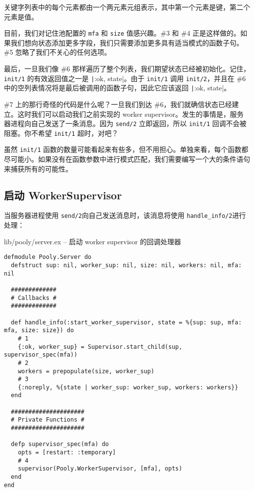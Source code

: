 关键字列表中的每个元素都由一个两元素元组表示，其中第一个元素是键，第二个元素是值。

目前，我们对记住池配置的 \texttt{mfa} 和
\texttt{size} 值感兴趣。\#3 和 \#4
正是这样做的。如果我们想向状态添加更多字段，我们只需要添加更多具有适当模式的函数子句。\#5
忽略了我们不关心的任何选项。

最后，一旦我们像 \#6
那样遍历了整个列表，我们期望状态已经被初始化。记住，\texttt{init/1}
的有效返回值之一是 \texttt|{:ok, state}|。由于
\texttt{init/1} 调用
\texttt{init/2}，并且在 \#6
中的空列表情况将是最后被调用的函数子句，因此它应该返回
\texttt|{:ok, state}|。

\#7 上的那行奇怪的代码是什么呢？一旦我们到达
\#6，我们就确信状态已经建立。这时我们可以启动我们之前实现的 worker
supervisor。发生的事情是，服务器进程向自己发送了一条消息。因为
\texttt{send/2} 立即返回，所以
\texttt{init/1} 回调不会被阻塞。你不希望
\texttt{init/1} 超时，对吧？

虽然 \texttt{init/1}
函数的数量可能看起来有些多，但不用担心。单独来看，每个函数都尽可能小。如果没有在函数参数中进行模式匹配，我们需要编写一个大的条件语句来捕获所有的可能性。


\subsection{启动 WorkerSupervisor}

当服务器进程使用 \texttt{send/2}向自己发送消息时，该消息将使用 \texttt{handle\_info/2}进行处理：

\begin{code}{lib/pooly/server.ex -- 启动 worker supervisor 的回调处理器}

\begin{verbatim}
defmodule Pooly.Server do
  defstruct sup: nil, worker_sup: nil, size: nil, workers: nil, mfa: nil

  #############
  # Callbacks #
  #############

  def handle_info(:start_worker_supervisor, state = %{sup: sup, mfa: mfa, size: size}) do
    # 1
    {:ok, worker_sup} = Supervisor.start_child(sup, supervisor_spec(mfa))
    # 2
    workers = prepopulate(size, worker_sup)
    # 3
    {:noreply, %{state | worker_sup: worker_sup, workers: workers}}
  end

  #####################
  # Private Functions #
  #####################

  defp supervisor_spec(mfa) do
    opts = [restart: :temporary]
    # 4
    supervisor(Pooly.WorkerSupervisor, [mfa], opts)
  end
end
\end{verbatim}
\end{code}

